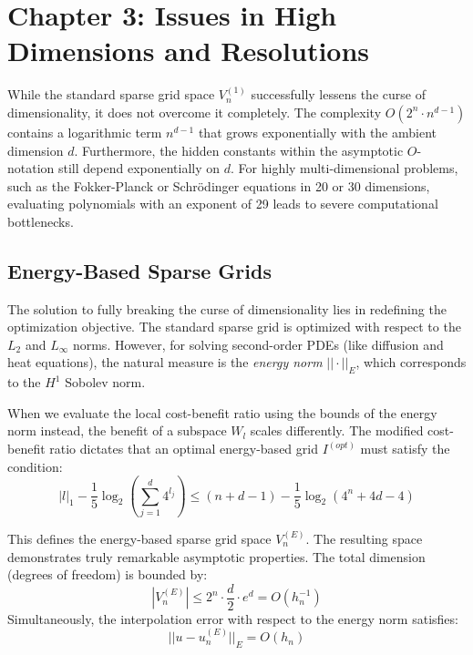 \documentclass[12pt, a4paper]{article}
\begin{document}
\section{Chapter 3: Issues in High Dimensions and Resolutions}

While the standard sparse grid space $V_n^{(1)}$ successfully lessens the curse of dimensionality, it does not overcome it completely. The complexity $O(2^n \cdot n^{d-1})$ contains a logarithmic term $n^{d-1}$ that grows exponentially with the ambient dimension $d$. Furthermore, the hidden constants within the asymptotic $O$-notation still depend exponentially on $d$. For highly multi-dimensional problems, such as the Fokker-Planck or Schrödinger equations in 20 or 30 dimensions, evaluating polynomials with an exponent of 29 leads to severe computational bottlenecks.

\subsection{Energy-Based Sparse Grids}
The solution to fully breaking the curse of dimensionality lies in redefining the optimization objective. The standard sparse grid is optimized with respect to the $L_2$ and $L_\infty$ norms. However, for solving second-order PDEs (like diffusion and heat equations), the natural measure is the \textit{energy norm} $|| \cdot ||_E$, which corresponds to the $H^1$ Sobolev norm.

When we evaluate the local cost-benefit ratio using the bounds of the energy norm instead, the benefit of a subspace $W_l$ scales differently. The modified cost-benefit ratio dictates that an optimal energy-based grid $I^{(opt)}$ must satisfy the condition:
\begin{equation}
|l|_1 - \frac{1}{5} \log_2\left(\sum_{j=1}^d 4^{l_j}\right) \le (n+d-1) - \frac{1}{5} \log_2(4^n + 4d - 4)
\end{equation}

This defines the energy-based sparse grid space $V_n^{(E)}$. The resulting space demonstrates truly remarkable asymptotic properties. The total dimension (degrees of freedom) is bounded by:
\begin{equation}
|V_n^{(E)}| \le 2^n \cdot \frac{d}{2} \cdot e^d = O(h_n^{-1})
\end{equation}
Simultaneously, the interpolation error with respect to the energy norm satisfies:
\begin{equation}
||u - u_n^{(E)}||_E = O(h_n)
\end{equation}
\end{document}
